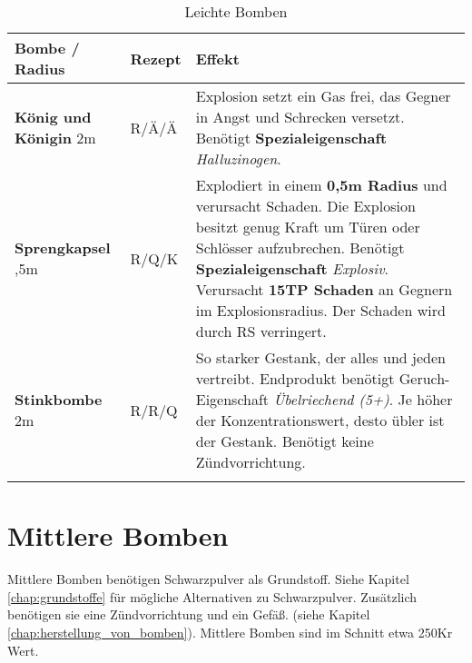 \begin{longtable}{|p{4cm}|p{}|p{9cm}|}
\hline
\textbf{Bombe} / Radius & \textbf{Rezept} & \textbf{Effekt} \\ \hline

\textbf{König und Königin} \newline 2m & R/Ä/Ä & Explosion setzt ein Gas frei, das Gegner in Angst und Schrecken versetzt. Benötigt \textbf{Spezialeigenschaft} \textit{Halluzinogen}. \\ \hline

\textbf{Sprengkapsel} \newline 0,5m & R/Q/K & Explodiert in einem \textbf{0,5m Radius} und verursacht Schaden. Die Explosion besitzt genug Kraft um Türen oder Schlösser aufzubrechen. Benötigt \textbf{Spezialeigenschaft} \textit{Explosiv}. Verursacht \textbf{15TP Schaden} an Gegnern im Explosionsradius. Der Schaden wird durch RS verringert. \\ \hline

\textbf{Stinkbombe} \newline 2m & R/R/Q & So starker Gestank, der alles und jeden vertreibt. Endprodukt benötigt Geruch-Eigenschaft \textit{Übelriechend (5+)}. Je höher der Konzentrationswert, desto übler ist der Gestank. Benötigt keine Zündvorrichtung. \\ \hline

\caption{Leichte Bomben}
\label{tab:leichte_bomben}
\end{longtable}


\section{Mittlere Bomben}
Mittlere Bomben benötigen Schwarzpulver als Grundstoff. Siehe Kapitel \ref{chap:grundstoffe} für mögliche Alternativen zu Schwarzpulver. Zusätzlich benötigen sie eine Zündvorrichtung und ein Gefäß. (siehe Kapitel \ref{chap:herstellung_von_bomben}). Mittlere Bomben sind im Schnitt etwa 250Kr Wert.

